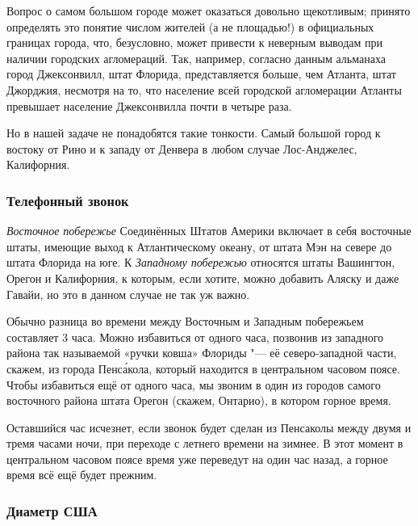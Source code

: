 \documentclass[twoside]{book}
\begin{document}
Вопрос о самом большом городе может оказаться довольно щекотливым; 
принято определять это понятие числом жителей (а не площадью!) в официальных границах города, что, безусловно, может привести к неверным выводам
при наличии городских агломераций.
Так, например, согласно данным альманаха город Джексонвилл, штат Флорида, представляется больше, чем Атланта, штат Джорджия, несмотря на то, что население всей городской агломерации Атланты превышает население Джексонвилла почти в четыре раза.

\medskip

Но в нашей задаче не понадобятся такие тонкости.
Самый большой город к востоку от Рино и к западу от Денвера в любом случае Лос-Анджелес, Калифорния.
\heart

\subsubsection*{Телефонный звонок}%

\emph{Восточное побережье} Соединённых Штатов Америки включает в себя восточные штаты, имеющие выход к Атлантическому океану, от штата Мэн на севере до штата Флорида на юге.
К \emph{Западному побережью} относятся штаты Вашингтон, Орегон и Калифорния,
к которым, если хотите, можно добавить Аляску и даже Гавайи, но это в данном случае не так уж важно. %

Обычно разница во времени между Восточным и Западным побережьем составляет 3 часа.
Можно избавиться от одного часа, позвонив из западного района так называемой «ручки ковша» Флориды "--- её северо-западной части, %
скажем, из города Пенс\'{а}кола, который находится в центральном часовом поясе.
Чтобы избавиться ещё от одного часа, мы звоним в один из городов самого восточного района штата Орегон (скажем, Онтарио), в котором горное время.

Оставшийся час исчезнет, если звонок будет сделан из Пенсаколы между двумя и тремя часами ночи, при переходе с летнего времени на зимнее.
В этот момент в центральном часовом поясе время уже переведут на один час назад, а горное время всё ещё будет прежним.\heart 

       
                                  
\subsubsection*{Диаметр США}%
\end{document}

